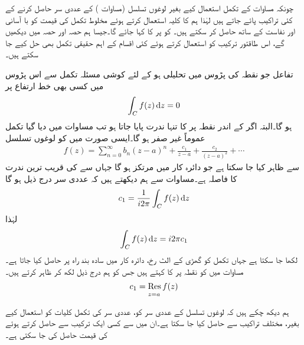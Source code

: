چونکہ مساوات  کے تکمل استعمال کیے بغیر لوغوں تسلسل (مساوات ) کے عددی سر حاصل کرنے کے کئی تراکیب پائے جاتے ہیں لہٰذا ہم  کا کلیہ استعمال کرتے ہوئے مخلوط تکمل کی قیمت کو با آسانی اور  نفاست کے ساتھ حاصل کر سکتے ہیں۔  کو  پر  کا  کہا جائے گا۔جیسا ہم حصہ  اور حصہ  میں دیکھیں گے، اس طاقتور ترکیب کو استعمال کرتے ہوئے کئی اقسام کے اہم حقیقی تکمل بھی حل کیے جا سکتے ہیں۔

تفاعل  جو نقطہ  کی پڑوس میں تحلیلی ہو کے لئے کوشی مسئلہ تکمل سے اس پڑوس میں کسی بھی خط ارتفاع  پر 
\begin{align}\label{مساوات_بقیہ_تکمل_الف}
\int_C f(z)\dif z=0
\end{align}
ہو گا۔البتہ اگر  کے اندر نقطہ   پر  کا تنہا ندرت پایا جاتا ہو تب  مساوات  میں دیا گیا تکمل عموماً غیر صفر ہو گا۔ایسی صورت میں  کو لوغوں تسلسل
\begin{align}\label{مساوات_بقیہ_تکمل_ب}
f(z)=\sum\limits_{n=0}^{\infty} b_n(z-a)^n+\frac{c_1}{z-a}+\frac{c_2}{(z-a)^2}+\cdots
\end{align}
سے ظاہر کیا جا سکتا ہے جو دائرہ کار  میں مرتکز ہو گا جہاں  سے  کی قریب ترین ندرت کا فاصلہ  ہے۔مساوات  سے ہم دیکھتے ہیں کہ عددی سر  درج ذیل ہو گا
\begin{align*}
c_1=\frac{1}{i2\pi}\int_C f(z)\dif z
\end{align*}
لہٰذا
\begin{align}\label{مساوات_بقیہ_تکمل_پ}
\int_C f(z)\dif z=i2\pi c_1
\end{align}
لکھا جا سکتا ہے جہاں تکمل کو گھڑی کے الٹ رخ، دائرہ کار  میں سادہ بند راہ   پر حاصل کیا جاتا ہے۔مساوات  میں  کو نقطہ  پر  کا  کہتے ہیں جس کو ہم درج ذیل لکھ کر ظاہر کرتے ہیں۔
\begin{align}
c_1=\underset{z=a\hfill}{\Res f(z)}
\end{align}

ہم دیکھ چکے ہیں کہ لوغوں تسلسل کے عددی سر کو، عددی سر کی تکمل کلیات کو استعمال کیے بغیر، مختلف تراکیب سے حاصل کیا جا سکتا ہے۔ان میں سے  کسی ایک ترکیب سے  حاصل کرتے ہوئے  کی قیمت حاصل کی جا سکتی ہے۔  

